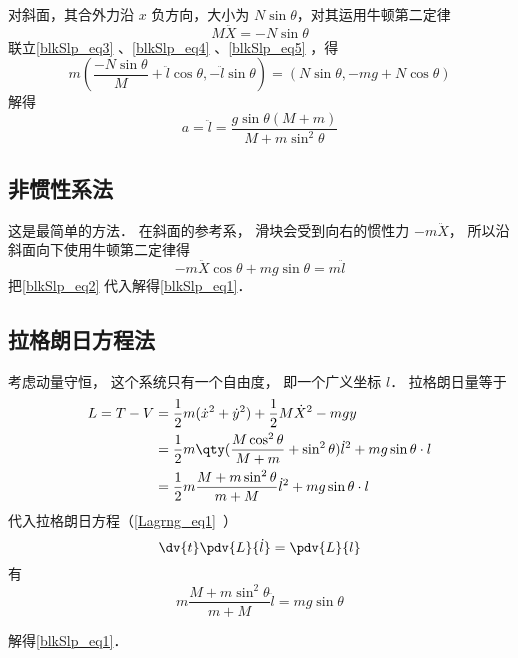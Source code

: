 对斜面，其合外力沿 $x$ 负方向，大小为 $N\sin\theta$，对其运用牛顿第二定律
\begin{equation}\label{blkSlp_eq5}
M\ddot X=-N\sin \theta
\end{equation}
联立\autoref{blkSlp_eq3} 、\autoref{blkSlp_eq4} 、\autoref{blkSlp_eq5} ，得
\begin{equation}
m(\frac{-N\sin\theta}{M}+\ddot l\cos\theta,-\ddot l\sin\theta)=(N\sin\theta,-mg+N\cos\theta)
\end{equation}
解得
\begin{equation}
a = \ddot l = \frac{g\sin\theta(M+m)}{M + m\sin^2\theta}
\end{equation}

\subsection{非惯性系法}
这是最简单的方法． 在斜面的参考系， 滑块会受到向右的惯性力 $-m\ddot X$， 所以沿斜面向下使用牛顿第二定律得
\begin{equation}
-m\ddot X\cos\theta + mg\sin\theta = m\ddot l
\end{equation}
把\autoref{blkSlp_eq2} 代入解得\autoref{blkSlp_eq1}．

\subsection{拉格朗日方程法}
考虑动量守恒， 这个系统只有一个自由度， 即一个广义坐标 $l$． 拉格朗日量等于
\begin{equation}
\begin{aligned}
L = T - V &= \frac12 m(\dot x^2 + \dot y^2) + \frac12 M \dot X^2 - mgy\\
&= \frac{1}{2}m \qty( \frac{M\cos^2\theta}{M + m}+\sin^2\theta) \dot l^2 + mg\sin\theta \cdot l\\
&=\frac{1}{2}m\frac{M+m\sin^2\theta}{m+M}\dot{l}^2+mg\sin\theta\cdot l
\end{aligned}
\end{equation}
代入拉格朗日方程（\autoref{Lagrng_eq1}~）
\begin{equation}
\dv{t} \pdv{L}{\dot l} = \pdv{L}{l}
\end{equation}
有
\begin{equation}
m\frac{M+m\sin^2\theta}{m+M}\ddot{l}=mg\sin\theta
\end{equation}

解得\autoref{blkSlp_eq1}．
